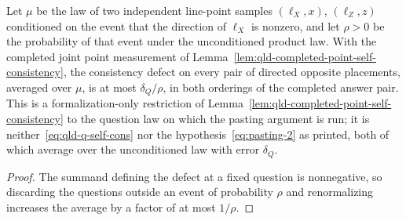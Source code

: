 \begin{lemma}
	\label{lem:qld-conditioned-completed-point-self-consistency}
	\leanok
	Let $\mu$ be the law of two independent line-point samples
	$(\ell_X, x)$, $(\ell_Z, z)$ conditioned on the event that the direction
	of $\ell_X$ is nonzero, and let $\rho > 0$ be the probability of that
	event under the unconditioned product law. With the completed joint point
	measurement of Lemma~\ref{lem:qld-completed-point-self-consistency}, the
	consistency defect on every pair of directed opposite placements, averaged
	over $\mu$, is at most $\delta_Q / \rho$, in both orderings of the
	completed answer pair.
	This is a formalization-only restriction of
	Lemma~\ref{lem:qld-completed-point-self-consistency} to the question law
	on which the pasting argument is run; it is neither~\eqref{eq:qld-q-self-cons}
	nor the hypothesis~\eqref{eq:pasting-2} as printed, both of which average
	over the unconditioned law with error $\delta_Q$.
\end{lemma}
\begin{proof}
	\leanok
	The summand defining the defect at a fixed question is nonnegative, so
	discarding the questions outside an event of probability $\rho$ and
	renormalizing increases the average by a factor of at most $1/\rho$.
\end{proof}

